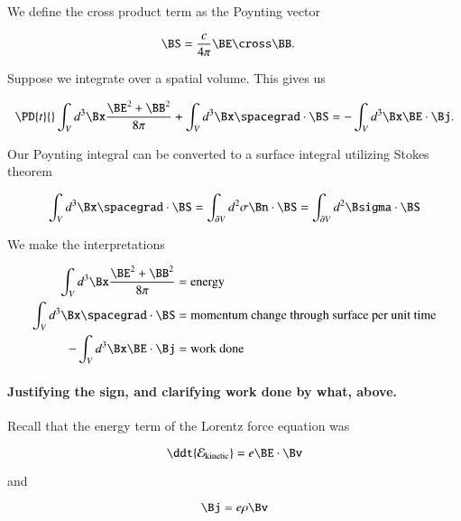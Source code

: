 We define the cross product term as the Poynting vector

\begin{align}\label{eqn:relativisticElectrodynamicsL16:650}
\BS &= \frac{c}{4 \pi} \BE \cross \BB.
\end{align}

Suppose we integrate over a spatial volume.  This gives us

\begin{equation}\label{eqn:relativisticElectrodynamicsL16:670b}
\PD{t}{}\int_V d^3 \Bx \frac{ \BE^2 + \BB^2 }{8 \pi} + \int_V d^3 \Bx \spacegrad \cdot \BS = - \int_V d^3 \Bx \BE \cdot \Bj.
\end{equation}

Our Poynting integral can be converted to a surface integral utilizing Stokes theorem

\begin{equation}\label{eqn:relativisticElectrodynamicsL16:800}
\int_V d^3 \Bx \spacegrad \cdot \BS = \int_{\partial V} d^2 \sigma \Bn \cdot \BS =
\int_{\partial V} d^2 \Bsigma \cdot \BS
\end{equation}

We make the interpretations

\begin{align*}
\int_V d^3 \Bx \frac{ \BE^2 + \BB^2 }{8 \pi} &= \mbox{energy} \\
\int_V d^3 \Bx \spacegrad \cdot \BS &= \mbox{momentum change through surface per unit time} \\
- \int_V d^3 \Bx \BE \cdot \Bj &= \mbox{work done}
\end{align*}

\paragraph{Justifying the sign, and clarifying work done by what, above.}

Recall that the energy term of the Lorentz force equation was

\begin{equation}\label{eqn:relativisticElectrodynamicsL16:820}
\ddt{\mathcal{E}_{\text{kinetic}}} = e \BE \cdot \Bv
\end{equation}

and

\begin{equation}\label{eqn:relativisticElectrodynamicsL16:840}
\Bj = e \rho \Bv
\end{equation}

